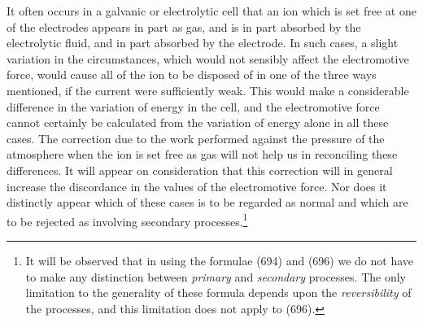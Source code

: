 \documentclass[12pt]{article}
\begin{document}
It often occurs in a galvanic or electrolytic cell that an ion which is set free at one of the electrodes appears in part as gas, and is in part absorbed by the electrolytic fluid, and in part absorbed by the electrode.   In such cases, a slight variation in the circumstances, which would not sensibly affect the electromotive force, would cause all of the ion to be disposed of in one of the three ways mentioned, if the current were sufficiently weak. This would make a considerable difference in the variation of energy in the cell, and the electromotive force cannot certainly be calculated from the variation of energy alone in all these cases. The correction due to the work performed against the pressure of the atmosphere when the ion is set free as gas will not help us in reconciling these differences. It will appear on consideration that this correction will in general increase the discordance in the values of the electromotive force. Nor does it distinctly appear which of these cases is to be regarded as normal and which are to be rejected as involving secondary processes.\footnote{It will be observed that in using the formulae (694) and (696) we do not have to make any distinction between \textit{primary} and \textit{secondary} processes. The only limitation to the generality of these formula depends upon the \textit{reversibility} of the processes, and this limitation does not apply to (696).}
\end{document}
